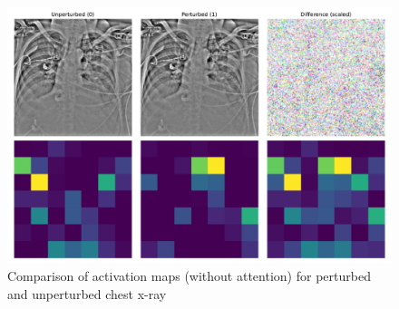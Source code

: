 \begin{figure}[h]
    \centering
    \includegraphics[width=\linewidth]{graphics/ResNet-50/different_maps.pdf}
    \caption{Comparison of activation maps (without attention) for perturbed and unperturbed chest x-ray}
    \label{DifferentMaps}
  \end{figure}